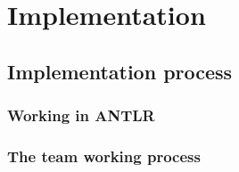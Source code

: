 \chapter{Implementation}

\section{Implementation process}

\subsection{Working in ANTLR}

\subsection{The team working process}

